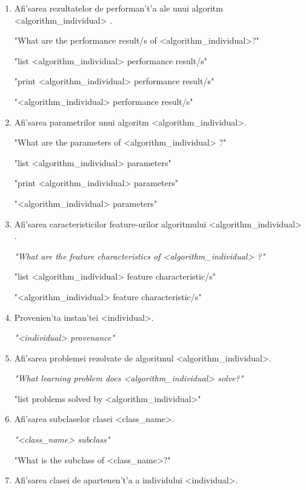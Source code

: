 \begin{enumerate}
{    "print <algorithm\_individual> disadvantage/s"
    
    "<algorithm\_individual> disadvantage/s"
}

\item Afi'sarea rezultatelor de performan't'a ale unui algoritm <algorithm\_individual> .

{\it

    "What are the performance result/s of <algorithm\_individual>?"
    
    "list <algorithm\_individual> performance result/s"
    
    "print <algorithm\_individual> performance result/s"
    
    "<algorithm\_individual> performance result/s"
}
    
\item Afi'sarea parametrilor unui algoritm <algorithm\_individual>.

{\it

    "What are the parameters of <algorithm\_individual> ?"
    
    "list <algorithm\_individual>  parameters"
    
    "print <algorithm\_individual>  parameters"
    
    "<algorithm\_individual>  parameters"
}
\item Afi'sarea caracteristicilor feature-urilor algoritmului <algorithm\_individual> .

{\it
    "What are the feature characteristics of <algorithm\_individual> ?"
    
    "list <algorithm\_individual>  feature characteristic/s"
    
    "<algorithm\_individual>  feature characteristic/s"
}
\item Provenien'ta instan'tei <individual>.

{\it
    "<individual> provenance"
}
    
\item Afi'sarea problemei rezolvate de algoritmul <algorithm\_individual>.

{\it
    "What learning problem does <algorithm\_individual> solve?"
    
    "list problems solved by <algorithm\_individual>"
}
\item Afi'sarea subclaselor clasei <class\_name>.

{\it
    "<class\_name> subclass"
    
    "What is the subclass of <class\_name>?"
 }   
\item Afi'sarea clasei de apartenen't'a a individului <individual>.


\end{enumerate}
